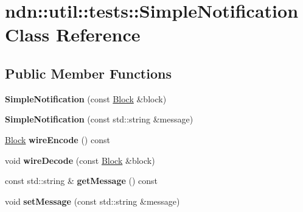 \hypertarget{classndn_1_1util_1_1tests_1_1SimpleNotification}{}\section{ndn\+:\+:util\+:\+:tests\+:\+:Simple\+Notification Class Reference}
\label{classndn_1_1util_1_1tests_1_1SimpleNotification}
\subsection*{Public Member Functions}
\begin{DoxyCompactItemize}
\item 
{\bfseries Simple\+Notification} (const \hyperlink{classndn_1_1Block}{Block} \&block)\hypertarget{classndn_1_1util_1_1tests_1_1SimpleNotification_a08c371ef3801ad0b0d8d46482e34a06a}{}\label{classndn_1_1util_1_1tests_1_1SimpleNotification_a08c371ef3801ad0b0d8d46482e34a06a}

\item 
{\bfseries Simple\+Notification} (const std\+::string \&message)\hypertarget{classndn_1_1util_1_1tests_1_1SimpleNotification_ae198b887a9dc8b06126ddd322d12bee3}{}\label{classndn_1_1util_1_1tests_1_1SimpleNotification_ae198b887a9dc8b06126ddd322d12bee3}

\item 
\hyperlink{classndn_1_1Block}{Block} {\bfseries wire\+Encode} () const\hypertarget{classndn_1_1util_1_1tests_1_1SimpleNotification_aba91c17b3a5b41362142ed6d332e031d}{}\label{classndn_1_1util_1_1tests_1_1SimpleNotification_aba91c17b3a5b41362142ed6d332e031d}

\item 
void {\bfseries wire\+Decode} (const \hyperlink{classndn_1_1Block}{Block} \&block)\hypertarget{classndn_1_1util_1_1tests_1_1SimpleNotification_a3f93d33cfd6bf026ca6dce8f1067d4a1}{}\label{classndn_1_1util_1_1tests_1_1SimpleNotification_a3f93d33cfd6bf026ca6dce8f1067d4a1}

\item 
const std\+::string \& {\bfseries get\+Message} () const\hypertarget{classndn_1_1util_1_1tests_1_1SimpleNotification_a8d6be5a6dfba7b0ed28d060ebcbed2e7}{}\label{classndn_1_1util_1_1tests_1_1SimpleNotification_a8d6be5a6dfba7b0ed28d060ebcbed2e7}

\item 
void {\bfseries set\+Message} (const std\+::string \&message)\hypertarget{classndn_1_1util_1_1tests_1_1SimpleNotification_a289fb5b01afd76fbae64b6a968919874}{}\label{classndn_1_1util_1_1tests_1_1SimpleNotification_a289fb5b01afd76fbae64b6a968919874}

\end{DoxyCompactItemize}


